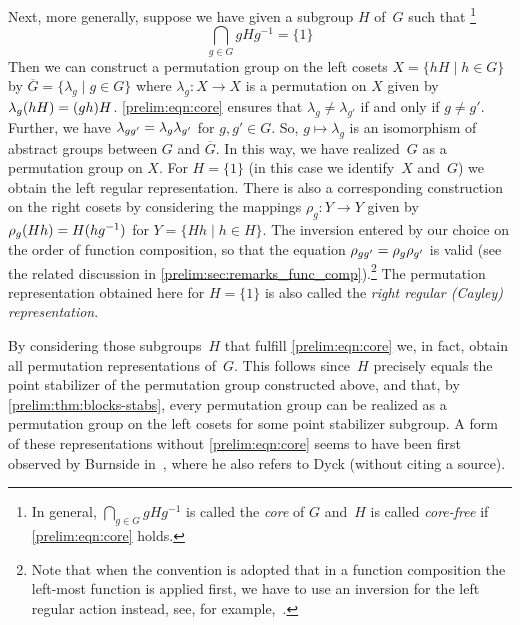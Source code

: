 Next, more generally, suppose we have given a subgroup $H$ of~$G$ such that
\footnote{In general,
	$\bigcap_{g \in G} gHg^{-1}$
	is called the \emph{core} of $G$
	and~$H$ is called \emph{core-free} if \cref{prelim:eqn:core} holds.}	
\begin{equation}\label{prelim:eqn:core}
	\bigcap_{g \in G} gHg^{-1} = \{1\}
\end{equation}
Then we can construct a
permutation group on the left cosets $X = \{ hH \mid h \in G\}$
by $\overline{G} = \{ \lambda_g \mid g \in G \}$
where $\lambda_g \colon X \to X$ is a permutation
on $X$ given by $\applyfunc{hH}{\lambda_g} = (gh)H$.
\cref{prelim:eqn:core} ensures that $\lambda_{g} \ne \lambda_{g'}$
if and only if $g \ne g'$.
Further, we have $\lambda_{gg'} = \concat{\lambda_{g'}}{\lambda_{g}}$
for $g, g' \in G$. So, $g \mapsto \lambda_g$ 
is an isomorphism of abstract groups between $G$ and $\overline G$.
In this way, we have realized~$G$ as a permutation group on $X$.
For $H = \{1\}$ (in this case we identify~$X$ and~$G$)
we obtain the left regular representation. 
There is also a corresponding construction on the right cosets 
by considering the mappings $\rho_g \colon Y \to Y$
given by $\applyfunc{Hh}{\rho_g} = H(hg^{-1})$
for $Y = \{ Hh \mid h \in H\}$. The inversion entered by our choice
on the order of function composition,
so that the equation $\rho_{gg'} = \concat{\rho_{g'}}{\rho_{g}}$
is valid (see the related discussion in \cref{prelim:sec:remarks_func_comp}).\footnote{Note that when 
	the convention is adopted that in a function composition the left-most
	function is applied first, we have to use an inversion for the left regular action
	instead, see, for example,~\cite{cameron_1999}.}
The permutation representation obtained here
for $H = \{1\}$ is also called the \emph{right regular (Cayley) representation}.

By considering those subgroups~$H$ that fulfill \cref{prelim:eqn:core} 
we, in fact, obtain all permutation representations of~$G$.
This follows since~$H$ precisely equals the point stabilizer
of the permutation group constructed above, and
that, by \cref{prelim:thm:blocks-stabs}, every permutation group
can be realized as a permutation group on the left cosets for some 
point stabilizer subgroup.
A form of these representations without \cref{prelim:eqn:core} seems to have been first observed by Burnside in~\cite{Burnside1901_representation_permutation}, where he also refers to Dyck (without citing a source).